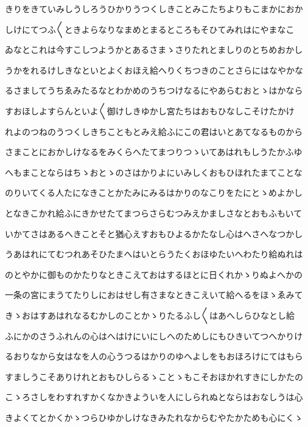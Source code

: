 \documentclass[a4paper,11pt,landscape]{ltjtarticle}
\begin{document}
\par\medskip
きりをきていみしうしろうひかりうつくしきことみこたちよりもこまかにおか
\par\medskip
しけにてつふ〱ときよらなりなまめとまるところもそひてみれはにやまなこ
\par\medskip
ゐなとこれは今すこしつようかとあるさまゝさりたれとましりのとちめおかし
\par\medskip
うかをれるけしきなといとよくおほえ給へりくちつきのことさらにはなやかな
\par\medskip
るさましてうちゑみたるなとわかめのうちつけなるにやあらむおとゝはかなら
\par\medskip
すおほしよすらんといよ〱御けしきゆかし宮たちはおもひなしこそけたかけ
\par\medskip
れよのつねのうつくしきちこともとみえ給ふにこの君はいとあてなるものから
\par\medskip
さまことにおかしけなるをみくらへたてまつりつゝいてあはれもしうたかふゆ
\par\medskip
へもまことならはちゝおとゝのさはかりよにいみしくおもひほれたまてことな
\par\medskip
のりいてくる人たになきことかたみにみるはかりのなこりをたにとゝめよかし
\par\medskip
となきこかれ給ふにきかせたてまつらさらむつみえかましさなとおもふもいて
\par\medskip
いかてさはあるへきことそと猶心えすおもひよるかたなし心はへさへなつかし
\par\medskip
うあはれにてむつれあそひたまへはいとらうたくおほゆたいへわたり給ぬれは
\par\medskip
のとやかに御ものかたりなときこえておはするほとに日くれかゝりぬよへかの
\par\medskip
一条の宮にまうてたりしにおはせし有さまなときこえいて給へるをほゝゑみて
\par\medskip
きゝおはすあはれなるむかしのことかゝりたるふし〱はあへしらひなとし給
\par\medskip
ふにかのさうふれんの心はへはけにいにしへのためしにもひきいてつへかりけ
\par\medskip
るおりなから女はなを人の心うつるはかりのゆへよしをもおほろけにてはもら
\par\medskip
すましうこそありけれとおもひしらるゝことゝもこそおほかれすきにしかたの
\par\medskip
こゝろさしをわすれすかくなかきよういを人にしられぬとならはおなしうは心
\par\medskip
きよくてとかくかゝつらひゆかしけなきみたれなからむやたかためも心にくゝ
\par\medskip
\end{document}
